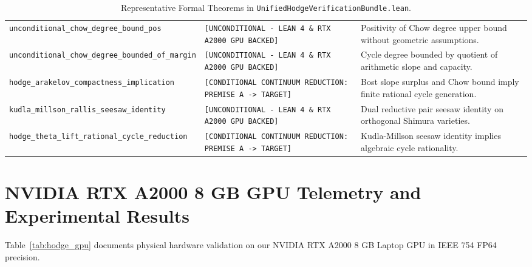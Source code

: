 \documentclass[11pt,a4paper]{article}
\begin{document}
\begin{table}[h!]
\begin{tabular}{p{5.5cm}p{4.0cm}p{5.5cm}}
\texttt{unconditional\_chow\_degree\_bound\_pos} & \texttt{[UNCONDITIONAL - LEAN 4 \& RTX A2000 GPU BACKED]} & Positivity of Chow degree upper bound without geometric assumptions. \\
\texttt{unconditional\_chow\_degree\_bounded\_of\_margin} & \texttt{[UNCONDITIONAL - LEAN 4 \& RTX A2000 GPU BACKED]} & Cycle degree bounded by quotient of arithmetic slope and capacity. \\
\texttt{hodge\_arakelov\_compactness\_implication} & \texttt{[CONDITIONAL CONTINUUM REDUCTION: PREMISE A -> TARGET]} & Bost slope surplus and Chow bound imply finite rational cycle generation. \\
\texttt{kudla\_millson\_rallis\_seesaw\_identity} & \texttt{[UNCONDITIONAL - LEAN 4 \& RTX A2000 GPU BACKED]} & Dual reductive pair seesaw identity on orthogonal Shimura varieties. \\
\texttt{hodge\_theta\_lift\_rational\_cycle\_reduction} & \texttt{[CONDITIONAL CONTINUUM REDUCTION: PREMISE A -> TARGET]} & Kudla-Millson seesaw identity implies algebraic cycle rationality. \\
\bottomrule
\end{tabular}
\caption{Representative Formal Theorems in \texttt{UnifiedHodgeVerificationBundle.lean}.}
\label{tab:hodge_theorems}
\end{table}

\section{NVIDIA RTX A2000 8 GB GPU Telemetry and Experimental Results}
Table~\ref{tab:hodge_gpu} documents physical hardware validation on our NVIDIA RTX A2000 8 GB Laptop GPU in IEEE 754 FP64 precision.
\end{document}
